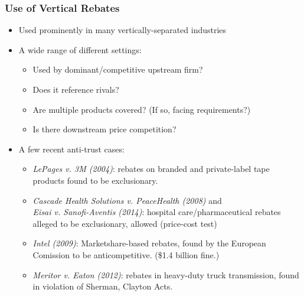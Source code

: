 \documentclass[aspectratio=169]{beamer}
\begin{document}
\begin{frame}
\frametitle{Use of Vertical Rebates}
\begin{itemize}
\item Used prominently in many vertically-separated industries 
\item A wide range of different settings:
	\begin{itemize}
	\item Used by dominant/competitive upstream firm? 
	\item Does it reference rivals? 
	\item Are multiple products covered? (If so, facing requirements?)
	\item Is there downstream price competition?
	\end{itemize}
\item A few recent anti-trust cases: 
	\begin{itemize} \footnotesize
	\item \textit{LePages v. 3M (2004)}: rebates on branded and private-label tape products found to be exclusionary.
	\item \textit{Cascade Health Solutions v. PeaceHealth (2008)} and \\ \textit{Eisai v. Sanofi-Aventis (2014)}: hospital care/pharmaceutical rebates alleged to be exclusionary, allowed (price-cost test) \\
	\item \textit{Intel (2009)}: Marketshare-based rebates, found by the European Comission to be anticompetitive. (\$1.4 billion fine.)
	\item \textit{Meritor v. Eaton (2012)}: rebates in heavy-duty truck transmission, found in violation of Sherman, Clayton Acts.
	\end{itemize}
\end{itemize}
\end{frame}
\end{document}
